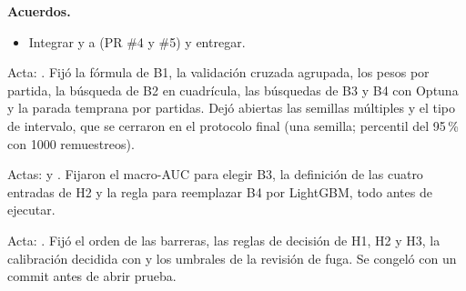 \noindent\textbf{Acuerdos.}
\begin{itemize}
  \item Integrar  y  a 
        (PR \#4 y \#5) y entregar.
\end{itemize}


Acta: . Fij\'o la f\'ormula de
B1, la validaci\'on cruzada agrupada, los pesos por partida, la b\'usqueda de
B2 en cuadr\'icula, las b\'usquedas de B3 y B4 con Optuna y la parada
temprana por partidas. Dej\'o abiertas las semillas m\'ultiples y el tipo de
intervalo, que se cerraron en el protocolo final (una semilla; percentil del
95\,\% con 1000 remuestreos).


Actas:  y
. Fijaron el macro-AUC para elegir B3,
la definici\'on de las cuatro entradas de H2 y la regla para reemplazar B4
por LightGBM, todo antes de ejecutar.


Acta: . Fij\'o el orden de las
barreras, las reglas de decisi\'on de H1, H2 y H3, la calibraci\'on decidida
con  y los umbrales de la revisi\'on de fuga. Se congel\'o con un
commit antes de abrir prueba.